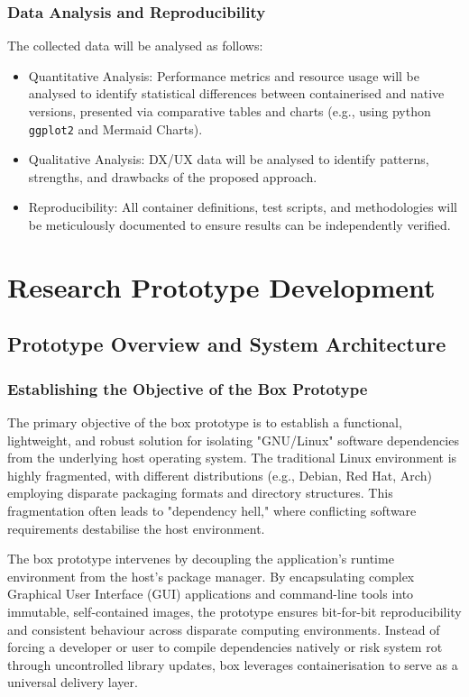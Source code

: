 \documentclass[journal,onecolumn]{IEEEtran}
\newcommand{\code}[1]{\texttt{#1}}
\begin{document}
\subsubsection{Data Analysis and Reproducibility}
The collected data will be analysed as follows:
\begin{itemize}
    \item Quantitative Analysis: Performance metrics and resource usage will be analysed to identify statistical differences between containerised and native versions, presented via comparative tables and charts (e.g., using python \code{ggplot2} and Mermaid Charts).
    \item Qualitative Analysis: DX/UX data will be analysed to identify patterns, strengths, and drawbacks of the proposed approach.
    \item Reproducibility: All container definitions, test scripts, and methodologies will be meticulously documented to ensure results can be independently verified.
\end{itemize}
\newpage
\section{Research Prototype Development}
\subsection{Prototype Overview and System Architecture}
\subsubsection{Establishing the Objective of the Box Prototype}  
The primary objective of the box prototype is to establish a functional, lightweight, and robust solution for isolating "GNU/Linux" software dependencies from the underlying host operating system. The traditional Linux environment is highly fragmented, with different distributions (e.g., Debian, Red Hat, Arch) employing disparate packaging formats and directory structures. This fragmentation often leads to "dependency hell," where conflicting software requirements destabilise the host environment.

The box prototype intervenes by decoupling the application’s runtime environment from the host's package manager. By encapsulating complex Graphical User Interface (GUI) applications and command-line tools into immutable, self-contained images, the prototype ensures bit-for-bit reproducibility and consistent behaviour across disparate computing environments. Instead of forcing a developer or user to compile dependencies natively or risk system rot through uncontrolled library updates, box leverages containerisation to serve as a universal delivery layer.
\end{document}
